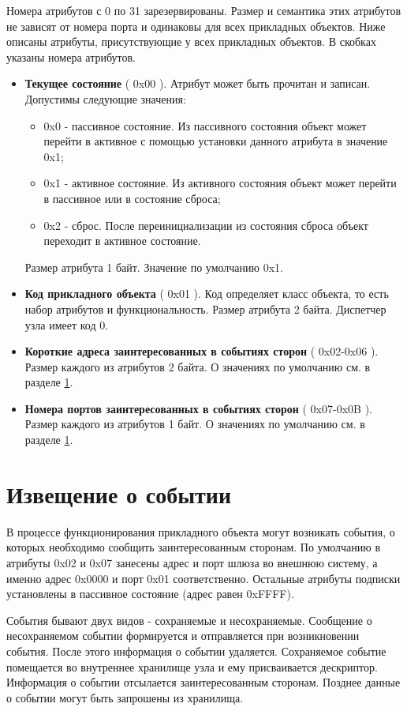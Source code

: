     Номера атрибутов с 0 по 31 зарезервированы. Размер и семантика этих атрибутов не зависят
от номера порта и одинаковы для всех прикладных объектов. Ниже описаны атрибуты, присутствующие 
у всех прикладных объектов. В скобках указаны номера атрибутов.

\begin{itemize}
\item {\bfseries Текущее состояние} ( 0x00 ). Атрибут может быть прочитан и записан. Допустимы следующие значения:
    \begin{itemize}
        \item 0x0 - пассивное состояние. Из пассивного состояния объект может перейти в активное с помощью установки данного
        атрибута в значение 0x1;
        \item 0x1 - активное состояние. Из активного состояния объект может перейти в пассивное или в состояние сброса;
        \item 0x2 - сброс. После переинициализации из состояния сброса объект переходит в активное состояние.
    \end{itemize}
Размер атрибута 1 байт. Значение по умолчанию 0x1. 
\item {\bfseries Код прикладного объекта} ( 0x01 ). Код определяет класс объекта, то есть набор атрибутов и функциональность.
Размер атрибута 2 байта. Диспетчер узла имеет код 0.
\item {\bfseries Короткие адреса заинтересованных в событиях сторон} ( 0x02-0x06 ). Размер каждого из атрибутов 2 байта. О значениях по умолчанию см. в разделе \ref{EventSubscription}.
\item {\bfseries Номера портов заинтересованных в событиях сторон} ( 0x07-0x0B ). Размер каждого из атрибутов 1 байт. О значениях по умолчанию см. в разделе \ref{EventSubscription}. 
\end{itemize}


\section{Извещение о событии} \label{EventSubscription}
    В процессе функционирования прикладного объекта могут возникать события, о которых
необходимо сообщить заинтересованным сторонам. По умолчанию в атрибуты 0x02 и 0x07 занесены адрес и порт шлюза во
внешнюю систему, а именно адрес 0x0000 и порт 0x01 соответственно. Остальные атрибуты подписки установлены в
пассивное состояние (адрес равен 0xFFFF).

События бывают двух видов - сохраняемые и несохраняемые. Сообщение о несохраняемом событии формируется
и отправляется при возникновении события. После этого информация о событии удаляется. 
Сохраняемое событие помещается во внутреннее хранилище узла и ему присваивается дескриптор.
Информация о событии отсылается заинтересованным сторонам. Позднее данные о событии могут быть
запрошены из хранилища. 

